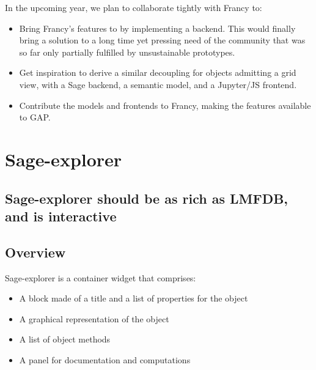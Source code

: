 \documentclass{deliverablereport}
\begin{document}
In the upcoming year, we plan to collaborate tightly with Francy to:
\begin{itemize}
\item Bring Francy's features to \Sage by implementing a backend. This
  would finally bring a solution to a long time yet pressing need of
  the community that was so far only partially fulfilled by
  unsustainable prototypes.
\item Get inspiration to derive a similar decoupling for objects
  admitting a grid view, with a Sage backend, a semantic model, and a
  Jupyter/JS frontend.
\item Contribute the models and frontends to Francy, making the
  features available to GAP.
\end{itemize}

\section{Sage-explorer}
\label{section:sage-explorer}


\subsection{Sage-explorer should be as rich as LMFDB, and is interactive}



\subsection{Overview}

Sage-explorer is a container widget that comprises:

\begin{itemize}
  \item A block made of a title and a list of properties for the object
  \item A graphical representation of the object
  \item A list of object methods
  \item A panel for documentation and computations
\end{itemize}

\end{document}
